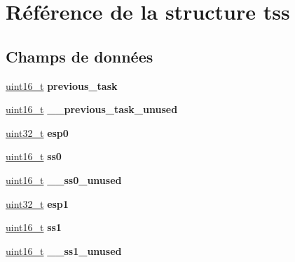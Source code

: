 \hypertarget{structtss}{\section{\-Référence de la structure tss}
\label{structtss}
}
\subsection*{\-Champs de données}
\begin{DoxyCompactItemize}
\item 
\hypertarget{structtss_ad53ac7d2e96d874b937cd8ba2ec99b68}{\hyperlink{types_8h_adf4d876453337156dde61095e1f20223}{uint16\-\_\-t} {\bfseries previous\-\_\-task}}\label{structtss_ad53ac7d2e96d874b937cd8ba2ec99b68}

\item 
\hypertarget{structtss_aa9c707a0e579d5c4aa5cdc6a74dc52f0}{\hyperlink{types_8h_adf4d876453337156dde61095e1f20223}{uint16\-\_\-t} {\bfseries \-\_\-\-\_\-previous\-\_\-task\-\_\-unused}}\label{structtss_aa9c707a0e579d5c4aa5cdc6a74dc52f0}

\item 
\hypertarget{structtss_a7e43a5ebd87f7dc5b342942daf46b6f1}{\hyperlink{types_8h_a33594304e786b158f3fb30289278f5af}{uint32\-\_\-t} {\bfseries esp0}}\label{structtss_a7e43a5ebd87f7dc5b342942daf46b6f1}

\item 
\hypertarget{structtss_a21766cd40c3c8f0036091d76956edc6c}{\hyperlink{types_8h_adf4d876453337156dde61095e1f20223}{uint16\-\_\-t} {\bfseries ss0}}\label{structtss_a21766cd40c3c8f0036091d76956edc6c}

\item 
\hypertarget{structtss_ae0b947bcd701d61513f54ae0fe5d8e67}{\hyperlink{types_8h_adf4d876453337156dde61095e1f20223}{uint16\-\_\-t} {\bfseries \-\_\-\-\_\-ss0\-\_\-unused}}\label{structtss_ae0b947bcd701d61513f54ae0fe5d8e67}

\item 
\hypertarget{structtss_ab2b4ce638811e1a254005e069886f8b3}{\hyperlink{types_8h_a33594304e786b158f3fb30289278f5af}{uint32\-\_\-t} {\bfseries esp1}}\label{structtss_ab2b4ce638811e1a254005e069886f8b3}

\item 
\hypertarget{structtss_aa527f4b4f275061d8750f527c7ab6fcf}{\hyperlink{types_8h_adf4d876453337156dde61095e1f20223}{uint16\-\_\-t} {\bfseries ss1}}\label{structtss_aa527f4b4f275061d8750f527c7ab6fcf}

\item 
\hypertarget{structtss_a1f7d520f366f7e044b4b0d0c66a8ced8}{\hyperlink{types_8h_adf4d876453337156dde61095e1f20223}{uint16\-\_\-t} {\bfseries \-\_\-\-\_\-ss1\-\_\-unused}}\label{structtss_a1f7d520f366f7e044b4b0d0c66a8ced8}


\end{DoxyCompactItemize}
